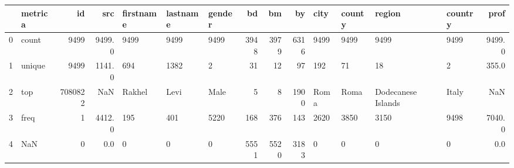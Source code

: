 \begin{tabular}{llrrlllrrrllllr}
\toprule
{} & metrica &       id &     src & firstname & lastname & gender &    bd &    bm &    by &  city & county &              region & country &    prof \\
\midrule
0 &   count &     9499 &  9499.0 &      9499 &     9499 &   9499 &  3948 &  3979 &  6316 &  9499 &   9499 &                9499 &    9499 &  9499.0 \\
1 &  unique &     9499 &  1141.0 &       694 &     1382 &      2 &    31 &    12 &    97 &   192 &     71 &                  18 &       2 &   355.0 \\
2 &     top &  7080822 &     NaN &    Rakhel &     Levi &   Male &     5 &     8 &  1900 &  Roma &   Roma &  Dodecanese Islands &   Italy &     NaN \\
3 &    freq &        1 &  4412.0 &       195 &      401 &   5220 &   168 &   376 &   143 &  2620 &   3850 &                3150 &    9498 &  7040.0 \\
4 &     NaN &        0 &     0.0 &         0 &        0 &      0 &  5551 &  5520 &  3183 &     0 &      0 &                   0 &       0 &     0.0 \\
\bottomrule
\end{tabular}

